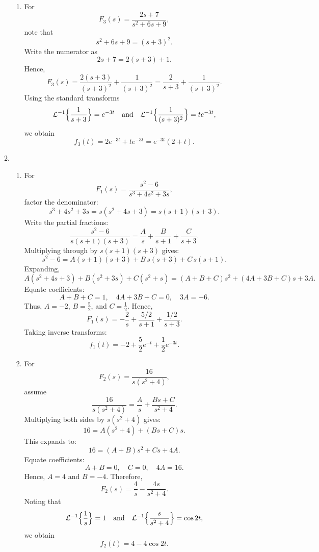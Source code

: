 \documentclass[12pt]{article}
\begin{document}
\begin{enumerate}
\begin{enumerate}
\begin{enumerate}
      \item For 
        \[
        F_3(s)=\frac{2s+7}{s^2+6s+9},
        \]
        note that
        \[
        s^2+6s+9=(s+3)^2.
        \]
        Write the numerator as
        \[
        2s+7=2(s+3)+1.
        \]
        Hence,
        \[
        F_3(s)=\frac{2(s+3)}{(s+3)^2}+\frac{1}{(s+3)^2}
        =\frac{2}{s+3}+\frac{1}{(s+3)^2}.
        \]
        Using the standard transforms
        \[
        \mathcal{L}^{-1}\Bigl\{\frac{1}{s+3}\Bigr\}=e^{-3t} \quad \text{and} \quad
        \mathcal{L}^{-1}\Bigl\{\frac{1}{(s+3)^2}\Bigr\}=te^{-3t},
        \]
        we obtain
        \[
        f_3(t)=2e^{-3t}+te^{-3t}=e^{-3t}(2+t).
        \]
    \end{enumerate}

  \item
    \begin{enumerate}
      \item For 
        \[
        F_1(s)=\frac{s^2-6}{s^3+4s^2+3s},
        \]
        factor the denominator:
        \[
        s^3+4s^2+3s=s(s^2+4s+3)=s(s+1)(s+3).
        \]
        Write the partial fractions:
        \[
        \frac{s^2-6}{s(s+1)(s+3)}
        =\frac{A}{s}+\frac{B}{s+1}+\frac{C}{s+3}.
        \]
        Multiplying through by \(s(s+1)(s+3)\) gives:
        \[
        s^2-6=A(s+1)(s+3)+B\,s(s+3)+C\,s(s+1).
        \]
        Expanding,
        \[
        A(s^2+4s+3)+B(s^2+3s)+C(s^2+s)
        =(A+B+C)s^2+(4A+3B+C)s+3A.
        \]
        Equate coefficients:
        \[
        A+B+C=1,\quad 4A+3B+C=0,\quad 3A=-6.
        \]
        Thus, \(A=-2\), \(B=\frac{5}{2}\), and \(C=\frac{1}{2}\). Hence,
        \[
        F_1(s)=-\frac{2}{s}+\frac{5/2}{s+1}+\frac{1/2}{s+3}.
        \]
        Taking inverse transforms:
        \[
        f_1(t)=-2+\frac{5}{2}e^{-t}+\frac{1}{2}e^{-3t}.
        \]

      \item For 
        \[
        F_2(s)=\frac{16}{s(s^2+4)},
        \]
        assume
        \[
        \frac{16}{s(s^2+4)}=\frac{A}{s}+\frac{Bs+C}{s^2+4}.
        \]
        Multiplying both sides by \(s(s^2+4)\) gives:
        \[
        16=A(s^2+4)+(Bs+C)s.
        \]
        This expands to:
        \[
        16=(A+B)s^2+Cs+4A.
        \]
        Equate coefficients:
        \[
        A+B=0,\quad C=0,\quad 4A=16.
        \]
        Hence, \(A=4\) and \(B=-4\). Therefore,
        \[
        F_2(s)=\frac{4}{s}-\frac{4s}{s^2+4}.
        \]
        Noting that
        \[
        \mathcal{L}^{-1}\Bigl\{\frac{1}{s}\Bigr\}=1 \quad \text{and} \quad
        \mathcal{L}^{-1}\Bigl\{\frac{s}{s^2+4}\Bigr\}=\cos2t,
        \]
        we obtain
        \[
        f_2(t)=4-4\cos2t.
        \]


\end{enumerate}
\end{enumerate}
\end{enumerate}
\end{document}

